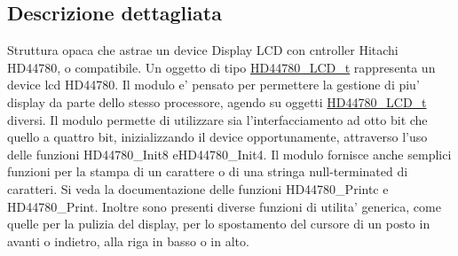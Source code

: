 \subsection{Descrizione dettagliata}
Struttura opaca che astrae un device Display L\+C\+D con cntroller Hitachi H\+D44780, o compatibile. Un oggetto di tipo \hyperlink{struct_h_d44780___l_c_d__t}{H\+D44780\+\_\+\+L\+C\+D\+\_\+t} rappresenta un device lcd H\+D44780. Il modulo e' pensato per permettere la gestione di piu' display da parte dello stesso processore, agendo su oggetti \hyperlink{struct_h_d44780___l_c_d__t}{H\+D44780\+\_\+\+L\+C\+D\+\_\+t} diversi. Il modulo permette di utilizzare sia l'interfacciamento ad otto bit che quello a quattro bit, inizializzando il device opportunamente, attraverso l'uso delle funzioni H\+D44780\+\_\+\+Init8 e\+H\+D44780\+\_\+\+Init4. Il modulo fornisce anche semplici funzioni per la stampa di un carattere o di una stringa null-\/terminated di caratteri. Si veda la documentazione delle funzioni H\+D44780\+\_\+\+Printc e H\+D44780\+\_\+\+Print. Inoltre sono presenti diverse funzioni di utilita' generica, come quelle per la pulizia del display, per lo spostamento del cursore di un posto in avanti o indietro, alla riga in basso o in alto. 

